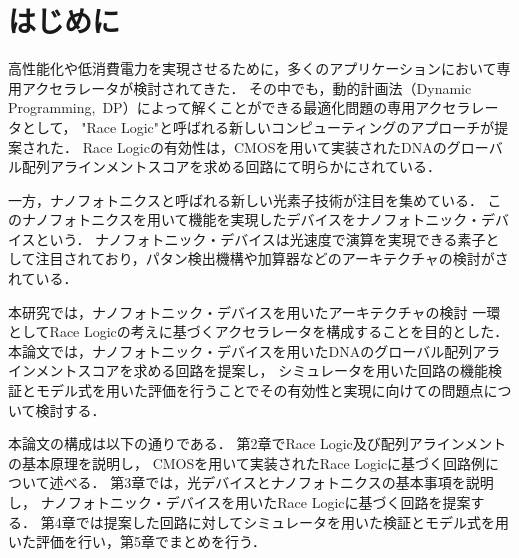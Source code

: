 \chapter{はじめに}
高性能化や低消費電力を実現させるために，多くのアプリケーションにおいて専用アクセラレータが検討されてきた．
その中でも，動的計画法（Dynamic Programming, DP）によって解くことができる最適化問題の専用アクセラレータとして，
"Race Logic"と呼ばれる新しいコンピューティングのアプローチが提案された\cite{madhavan2014race}．
Race Logicの有効性は，CMOSを用いて実装されたDNAのグローバル配列アラインメントスコアを求める回路にて明らかにされている．

一方，ナノフォトニクスと呼ばれる新しい光素子技術が注目を集めている．
このナノフォトニクスを用いて機能を実現したデバイスをナノフォトニック・デバイスという．
ナノフォトニック・デバイスは光速度で演算を実現できる素子として注目されており，パタン検出機構や加算器などのアーキテクチャの検討がされている．

本研究では，ナノフォトニック・デバイスを用いたアーキテクチャの検討
一環としてRace Logicの考えに基づくアクセラレータを構成することを目的とした．
本論文では，ナノフォトニック・デバイスを用いたDNAのグローバル配列アラインメントスコアを求める回路を提案し，
シミュレータを用いた回路の機能検証とモデル式を用いた評価を行うことでその有効性と実現に向けての問題点について検討する．

本論文の構成は以下の通りである．
第2章でRace Logic及び配列アラインメントの基本原理を説明し，
CMOSを用いて実装されたRace Logicに基づく回路例について述べる．
第3章では，光デバイスとナノフォトニクスの基本事項を説明し，
ナノフォトニック・デバイスを用いたRace Logicに基づく回路を提案する．
第4章では提案した回路に対してシミュレータを用いた検証とモデル式を用いた評価を行い，第5章でまとめを行う．

